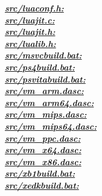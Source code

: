 \underline{\textbf{\emph{src/luaconf.h:}}}\\
\underline{\textbf{\emph{src/luajit.c:}}}\\
\underline{\textbf{\emph{src/luajit.h:}}}\\
\underline{\textbf{\emph{src/lualib.h:}}}\\
\underline{\textbf{\emph{src/msvcbuild.bat:}}}\\
\underline{\textbf{\emph{src/ps4build.bat:}}}\\
\underline{\textbf{\emph{src/psvitabuild.bat:}}}\\
\underline{\textbf{\emph{src/vm\_arm.dasc:}}}\\
\underline{\textbf{\emph{src/vm\_arm64.dasc:}}}\\
\underline{\textbf{\emph{src/vm\_mips.dasc:}}}\\
\underline{\textbf{\emph{src/vm\_mips64.dasc:}}}\\
\underline{\textbf{\emph{src/vm\_ppc.dasc:}}}\\
\underline{\textbf{\emph{src/vm\_x64.dasc:}}}\\
\underline{\textbf{\emph{src/vm\_x86.dasc:}}}\\
\underline{\textbf{\emph{src/xb1build.bat:}}}\\
\underline{\textbf{\emph{src/xedkbuild.bat:}}}\\